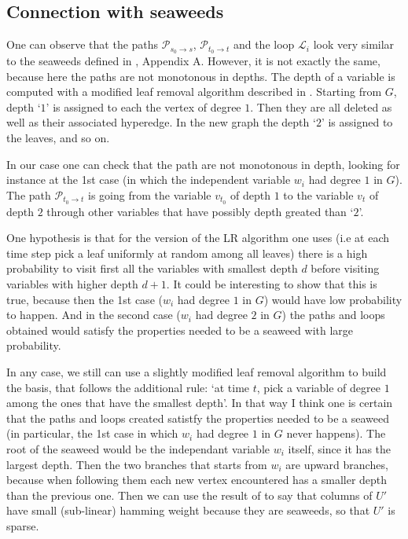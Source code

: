 \documentclass{article}
\begin{document}
\subsection*{Connection with seaweeds}

One can observe that the paths $\mathcal{P}_{s_0\to s}$, $\mathcal{P}_{t_0\to t}$ and the loop $\mathcal{L}_i$ look very similar to the seaweeds defined in \cite{MezardRicci03}, Appendix A. However, it is not exactly the same, because here the paths are not monotonous in depths. The depth of a variable is computed with a modified leaf removal algorithm described in \cite{MezardRicci03}. Starting from $G$, depth `$1$' is assigned to each the vertex of degree $1$. Then they are all deleted as well as their associated hyperedge. In the new graph the depth `$2$' is assigned to the leaves, and so on. 

In our case one can check that the path are not monotonous in depth, looking for instance at the 1st case (in which the independent variable $w_i$ had degree $1$ in $G$). The path $\mathcal{P}_{t_0\to t}$ is going from the variable $v_{t_0}$ of depth $1$ to the variable $v_t$ of depth $2$ through other variables that have possibly depth greated than `$2$'.

One hypothesis is that for the version of the LR algorithm one uses (i.e at each time step pick a leaf uniformly at random among all leaves) there is a high probability to visit first all the variables with smallest depth $d$ before visiting variables with higher depth $d+1$. It could be interesting to show that this is true, because then the 1st case ($w_i$ had degree $1$ in $G$) would have low probability to happen. And in the second case ($w_i$ had degree $2$ in $G$) the paths and loops obtained would satisfy the properties needed to be a seaweed with large probability.

In any case, we still can use a slightly modified leaf removal algorithm to build the basis, that follows the additional rule: `at time $t$, pick a variable of degree $1$ among the ones that have the smallest depth'. In that way I think one is certain that the paths and loops created satistfy the properties needed to be a seaweed (in particular, the 1st case in which $w_i$ had degree $1$ in $G$ never happens). The root of the seaweed would be the independant variable $w_i$ itself, since it has the largest depth. Then the two branches that starts from $w_i$ are upward branches, because when following them each new vertex encountered has a smaller depth than the previous one. Then we can use the result of \cite{MezardRicci03} to say that columns of $U'$ have small (sub-linear) hamming weight because they are seaweeds, so that $U'$ is sparse.
 


\end{document}
